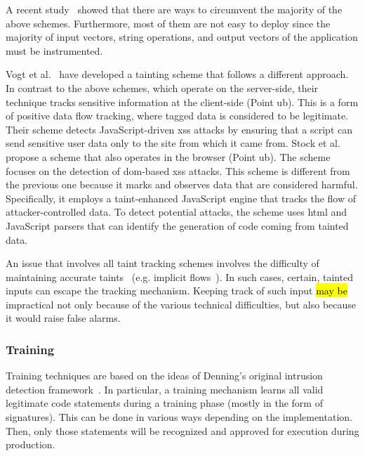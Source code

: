 \documentclass[10pt,journal,compsoc]{IEEEtran}
\newcommand{\hlc}[2][yellow]{ {\sethlcolor{#1} \hl{#2}} }
\begin{document}
A recent study~\cite{NBR14} showed that there are ways to circumvent
the majority of the above schemes. Furthermore, most of them are not
easy to deploy since the majority of input vectors, string operations,
and output vectors of the application must be instrumented.

Vogt et al.~\cite{VFJKKV07} have developed a tainting scheme
that follows a different approach. In contrast to the above
schemes, which operate on the server-side, their technique tracks sensitive
information at the client-side (Point {\sc ub}). This is a form of
positive data flow tracking, where tagged data is considered to be
legitimate. Their scheme detects JavaScript-driven {\sc xss} attacks
by ensuring that a script can send sensitive user data only to the
site from which it came from.
Stock et al.~\cite{SLMS14} propose a scheme that also operates
in the browser (Point {\sc ub}). The scheme focuses on the detection of
{\sc dom}-based {\sc xss} attacks.
This scheme is different from the previous one
because it marks and observes data that are considered harmful.
Specifically, it employs a taint-enhanced JavaScript engine that
tracks the flow of attacker-controlled data. To detect potential
attacks, the scheme uses {\sc html} and JavaScript parsers that can
identify the generation of code coming from tainted data.

An issue that involves all taint tracking schemes involves
the difficulty of maintaining accurate taints~\cite{GMPS11}
(e.g. implicit flows~\cite{ME07}).
In such cases, certain, tainted inputs can escape the tracking mechanism.
Keeping track of such input \hlc[yellow]{may be} impractical not only because of the
various technical difficulties, but also because it would raise false alarms.

\subsubsection{Training}
\label{sec:train}

Training techniques are based on the ideas of Denning's original
intrusion detection framework~\cite{Den87}. In particular, a training
mechanism learns all valid legitimate code statements during a
training phase (mostly in the form of signatures). This can be done in
various ways depending on the implementation. Then, only those
statements will be recognized and approved for execution during
production.
\end{document}
